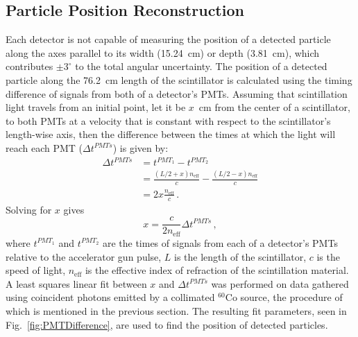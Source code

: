 \documentclass[%
 reprint,
 amsmath,amssymb,
 aps,
 nofootinbib
]{revtex4-1}
\begin{document}
\subsection{Particle Position Reconstruction}
Each detector is not capable of measuring the position of a detected particle along the axes parallel to its width (15.24~cm) or depth (3.81~cm), which contributes $\pm3^{\circ}$ to the total angular uncertainty.
The position of a detected particle along the 76.2~cm length of the scintillator is calculated using the timing difference of signals from both of a detector's PMTs.
Assuming that scintillation light travels from an initial point, let it be $x$~cm from the center of a scintillator, to both PMTs at a velocity that is constant with respect to the scintillator's length-wise axis, then the difference between the times at which the light will reach each PMT ($\Delta t^{PMTs}$) is given by:
\begin{equation}
\begin{split}
\Delta t^{PMTs} & = t^{PMT_1}-t^{PMT_2} \\ 
& = \frac{(L/2 + x) n_{\text{eff}}}{c} - \frac{(L/2-x) n_{\text{eff}}}{c} \\
& = 2x \frac{n_{\text{eff}}}{c}  \, .
\end{split}
\end{equation}
Solving for $x$ gives 
\begin{equation}
\label{eq:position}
x = \frac{c}{2n_{\text{eff}}} \Delta t^{PMTs} \, ,
\end{equation}
where $t^{PMT_{1}}$ and $t^{PMT_{2}}$ are the times of signals from each of a detector's PMTs relative to the accelerator gun pulse, $L$ is the length of the scintillator, $c$ is the speed of light, $n_{\text{eff}}$ is the effective index of refraction of the scintillation material.
A least squares linear fit between $x$ and $\Delta t^{PMTs}$ was performed on data gathered using coincident photons emitted by a collimated $^{60}$Co source, the procedure of which is mentioned in the previous section.
The resulting fit parameters, seen in Fig.~\ref{fig:PMTDifference}, are used to find the position of detected particles.
\end{document}
